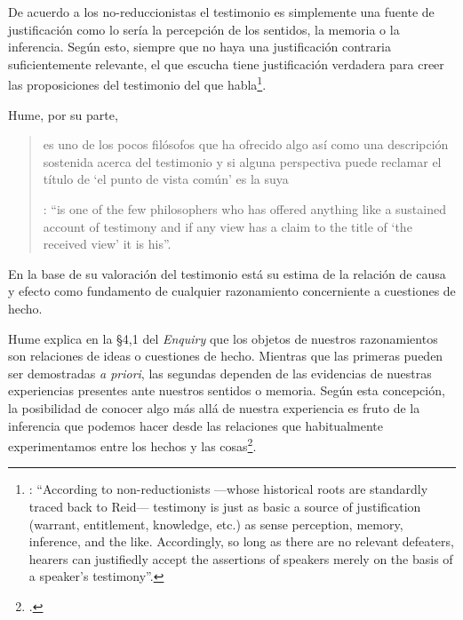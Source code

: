 De acuerdo a los no-reduccionistas el testimonio es simplemente una fuente de justificación como lo sería la percepción de los sentidos, la memoria o la inferencia. Según esto, siempre que no haya una justificación contraria suficientemente relevante, el que escucha tiene justificación verdadera para creer las proposiciones del testimonio del que habla\footnote{\cite[Cf.][4]{lackeysosa2006eptest}: \enquote{According to non-reductionists ---whose historical roots are standardly traced back to Reid--- testimony is just as basic a source of justification (warrant, entitlement, knowledge, etc.) as sense perception, memory, inference, and the like. Accordingly, so long as there are no relevant defeaters, hearers can justifiedly accept the assertions of speakers merely on the basis of a speaker's testimony}.}.

Hume, por su parte, \blockquote[{\Cite[79]{coady1992test}}: \enquote{is one of the few philosophers who has offered anything like a sustained account of testimony and if any view has a claim to the title of `the received view' it is his}.]{es uno de los pocos filósofos que ha ofrecido algo así como una descripción sostenida acerca del testimonio y si alguna perspectiva puede reclamar el título de `el punto de vista común' es la suya}. En la base de su valoración del testimonio está su estima de la relación de causa y efecto como fundamento de cualquier razonamiento concerniente a cuestiones de hecho.

Hume explica en la \S4,1 del \emph{Enquiry} que los objetos de nuestros razonamientos son relaciones de ideas o cuestiones de hecho. Mientras que las primeras pueden ser demostradas \emph{a priori}, las segundas dependen de las evidencias de nuestras experiencias presentes ante nuestros sentidos o memoria. Según esta concepción, la posibilidad de conocer algo más allá de nuestra experiencia es fruto de la inferencia que podemos hacer desde las relaciones que habitualmente experimentamos entre los hechos y las cosas\footnote{\cite[Cf.][\S4, 1. 47-54]{hume1777enquiryes}.}.

